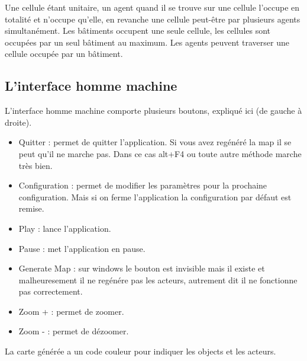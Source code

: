 \documentclass[12pt]{article}
\begin{document}
Une cellule étant unitaire, un agent quand il se trouve sur une cellule 
l'occupe en totalité et n'occupe qu'elle, en revanche une cellule peut-être 
par plusieurs agents simultanément. Les bâtiments occupent une seule cellule, 
les cellules sont occupées par un seul bâtiment au maximum. Les agents peuvent 
traverser une cellule occupée par un bâtiment.

	\subsection{L'interface homme machine}
	
L'interface homme machine comporte plusieurs boutons, expliqué ici (de gauche
à droite).\\

	\begin{itemize}

	\item Quitter : permet de quitter l'application. Si vous avez regénéré 
la map il se peut qu'il ne marche pas. Dans ce cas alt+F4 ou toute autre 
méthode marche très bien.

	\item Configuration : permet de modifier les paramètres pour la 
prochaine configuration. Mais si on ferme l'application la configuration 
par défaut est remise.

	\item Play : lance l'application.

	\item Pause : met l'application en pause.

	\item Generate Map : sur windows le bouton est invisible mais il 
existe et malheuresement il ne regénére pas les acteurs, autrement dit il 
ne fonctionne pas correctement.

	\item Zoom + : permet de zoomer.

	\item Zoom - : permet de dézoomer.\\

	\end{itemize}
	
La carte générée a un code couleur pour indiquer les objects et les acteurs.\\
\end{document}
